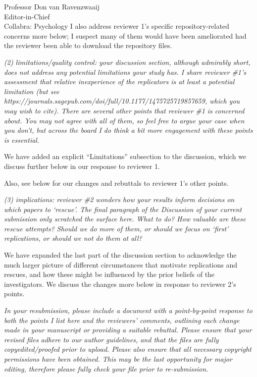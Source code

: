 \documentclass{stanfordletter}
\newcommand{\theysaid}[1]{\begin{leftbar} \noindent 
		\textsl{ #1}\end{leftbar}}
\begin{document}
\begin{letter}{Professor Don van Ravenzwaaij \\ Editor-in-Chief \\ Collabra: Psychology }
		I also address reviewer 1's specific repository-related concerns more below; I suspect many of them would have been ameliorated had the reviewer been able to download the repository files.  
		
		\theysaid{(2) limitations/quality control: your discussion section, although admirably short, does not address any potential limitations your study has. I share reviewer \#1’s assessment that relative inexperience of the replicators is at least a potential limitation (but see https://journals.sagepub.com/doi/full/10.1177/1475725719857659, which you may wish to cite). There are several other points that reviewer \#1 is concerned about. You may not agree with all of them, so feel free to argue your case when you don’t, but across the board I do think a bit more engagement with these points is essential.}
		
		
		We have added an explicit ``Limitations'' subsection to the discussion, which we discuss further below in our response to reviewer 1. 
		
		Also, see below for our changes and rebuttals to reviewer 1's other points.
		
		\theysaid{(3) implications: reviewer \#2 wonders how your results inform decisions on which papers to ‘rescue’. The final paragraph of the Discussion of your current submission only scratched the surface here. What to do? How valuable are these rescue attempts? Should we do more of them, or should we focus on ‘first’ replications, or should we not do them at all?}
		
		We have expanded the last part of the discussion section to acknowledge the much larger picture of different circumstances that motivate replications and rescues, and how these might be influenced by the prior beliefs of the investigators. We discuss the changes more below in response to reviewer 2's points. 
		
		\theysaid{In your resubmission, please include a document with a point-by-point response to both the points I list here and the reviewers’ comments, outlining each change made in your manuscript or providing a suitable rebuttal. Please ensure that your revised files adhere to our author guidelines, and that the files are fully copyedited/proofed prior to upload. Please also ensure that all necessary copyright permissions have been obtained. This may be the last opportunity for major editing, therefore please fully check your file prior to re-submission.}
		

\end{letter}
\end{document}
